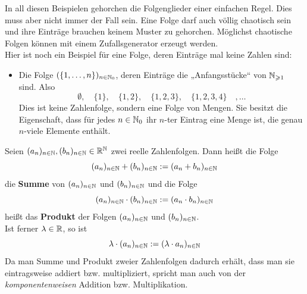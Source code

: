 \begin{bsp}
\begin{enumerate}[a)]
 \end{enumerate}
In all diesen Beispielen gehorchen die Folgenglieder einer einfachen Regel. Dies muss aber nicht immer der Fall sein. Eine Folge darf auch völlig chaotisch sein und ihre Einträge brauchen keinem Muster zu gehorchen. Möglichst chaotische Folgen können mit einem Zufallsgenerator erzeugt werden. \\
Hier ist noch ein Beispiel für eine Folge, deren Einträge mal keine Zahlen sind:
\begin{itemize}
 \item Die Folge $(\{1,\dots , n\})_{n\in {\mathbb N}_0}$, deren Einträge die „Anfangsstücke“ von ${\mathbb N}_{\geqslant 1}$ sind. Also
 \[ \emptyset,\quad \{1\},\quad \{1,2\},\quad \{1,2,3\},\quad \{1,2,3,4\}\quad,\dots \]
 Dies ist keine Zahlenfolge, sondern eine Folge von Mengen. Sie besitzt die Eigenschaft, dass für jedes $n\in {\mathbb N}_0$ ihr $n$-ter Eintrag eine Menge ist, die genau $n$-viele Elemente enthält.
\end{itemize}
\end{bsp}



\begin{de} \label{folgenrech}
Seien $(a_n)_{n\in {\mathbb N}}, (b_n)_{n\in {\mathbb N}}\in {\mathbb R}^{\mathbb N}$ zwei reelle Zahlenfolgen. Dann heißt die Folge
\[ (a_n)_{n\in {\mathbb N}}+(b_n)_{n\in {\mathbb N}} := (a_n + b_n)_{n\in {\mathbb N}} \]
die \textbf{Summe} von $(a_n)_{n\in {\mathbb N}}$ und $(b_n)_{n\in {\mathbb N}}$ und die Folge
\[ (a_n)_{n\in {\mathbb N}}\cdot (b_n)_{n\in {\mathbb N}}:= (a_n\cdot b_n)_{n\in {\mathbb N}} \]
heißt das \textbf{Produkt} der Folgen $(a_n)_{n\in {\mathbb N}}$ und $(b_n)_{n\in {\mathbb N}}$. \\
Ist ferner $\lambda\in {\mathbb R}$, so ist
\[ \lambda\cdot (a_n)_{n\in {\mathbb N}} := (\lambda\cdot a_n)_{n\in {\mathbb N}} \]
Da man Summe und Produkt zweier Zahlenfolgen dadurch erhält, dass man sie eintragsweise addiert bzw. multipliziert, spricht man auch von der \emph{komponentenweisen} Addition bzw. Multiplikation.
\end{de}


